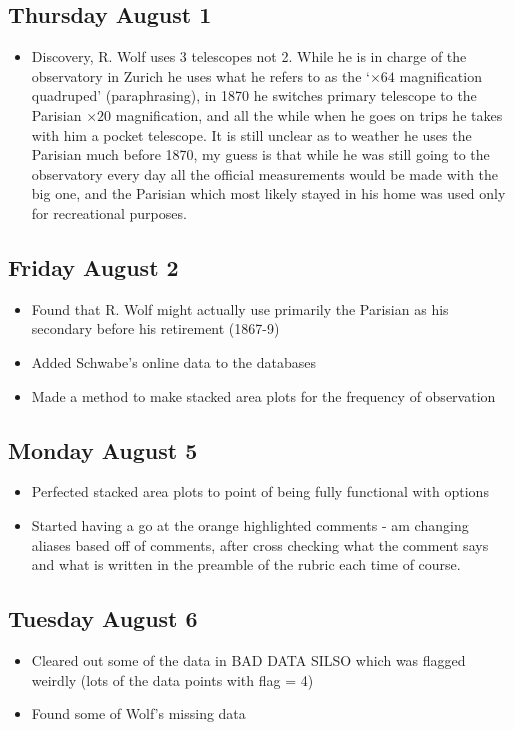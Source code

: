 \documentclass[12pt]{article}
\begin{document}
\subsection{Thursday August 1}
\begin{itemize}
    \item Discovery, R. Wolf uses 3 telescopes not 2. While he is in charge of the observatory in Zurich he uses what he refers to as the `$\times 64$ magnification quadruped' (paraphrasing), in 1870 he switches primary telescope to the Parisian $\times 20$ magnification, and all the while when he goes on trips he takes with him a pocket telescope. It is still unclear as to weather he uses the Parisian much before 1870, my guess is that while he was still going to the observatory every day all the official measurements would be made with the big one, and the Parisian which most likely stayed in his home was used only for recreational purposes.
\end{itemize}

\subsection{Friday August 2}
\begin{itemize}
    \item Found that R. Wolf might actually use primarily the Parisian as his secondary before his retirement (1867-9)
    \item Added Schwabe's online data to the databases
    \item Made a method to make stacked area plots for the frequency of observation
\end{itemize}

\subsection{Monday August 5}
\begin{itemize}
    \item Perfected stacked area plots to point of being fully functional with options
    \item Started having a go at the orange highlighted comments - am changing aliases based off of comments, after cross checking what the comment says and what is written in the preamble of the rubric each time of course.
\end{itemize}

\subsection{Tuesday August 6}
\begin{itemize}
    \item Cleared out some of the data in BAD DATA SILSO which was flagged weirdly (lots of the data points with flag = 4)
    \item Found some of Wolf's missing data
\end{itemize}
\end{document}
